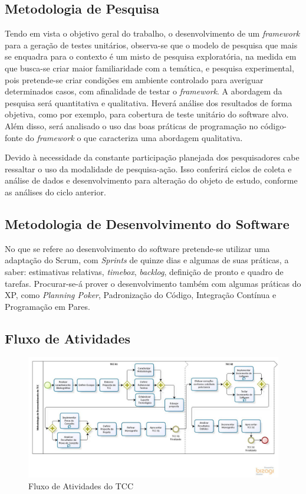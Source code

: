   \subsection{Metodologia de Pesquisa}
  Tendo em vista o objetivo geral do trabalho, o desenvolvimento de um \textit{framework} para a geração de testes unitários, observa-se que o modelo de pesquisa que mais se enquadra para o contexto é um misto de pesquisa exploratória, na medida em que busca-se criar maior familiaridade com a temática, e pesquisa experimental, pois pretende-se criar condições em ambiente controlado para averiguar determinados casos, com afinalidade de testar o \textit{framework}. A abordagem da pesquisa será quantitativa e qualitativa. Heverá análise dos resultados de forma objetiva, como por exemplo, para cobertura de teste unitário do software alvo. Além disso, será analisado o uso das boas práticas de programação no código-fonte do \textit{framework} o que caracteriza uma abordagem qualitativa.
  \par
  \indent Devido à necessidade da constante participação planejada dos pesquisadores cabe ressaltar o uso da modalidade de pesquisa-ação. Isso conferirá ciclos de coleta e análise de dados e desenvolvimento para alteração do objeto de estudo, conforme as análises do ciclo anterior.

 \subsection{Metodologia de Desenvolvimento do Software}
  No que se refere ao desenvolvimento do software pretende-se utilizar uma adaptação do Scrum, com \textit{Sprints} de quinze dias e algumas de suas práticas, a saber: estimativas relativas, \textit{timebox}, \textit{backlog}, definição de pronto e quadro de tarefas. Procurar-se-á prover o desenvolvimento também com algumas práticas do XP, como \textit{Planning Poker}, Padronização do Código, Integração Contínua e Programação em Pares.
 
 \subsection{Fluxo de Atividades}
  \begin{figure}[h]
    \centering
    \includegraphics[width=\textwidth]{figuras/processo.jpg}
    \caption{Fluxo de Atividades do TCC}
    \label{fig:processo}
  \end{figure}
 
